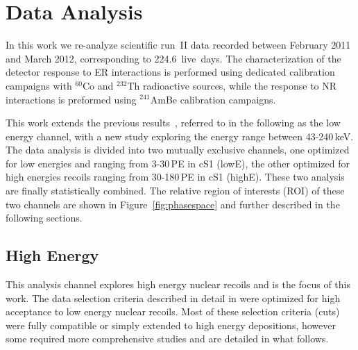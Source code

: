 \section{Data Analysis}
\label{sec:Analysis}
In this work we re-analyze  scientific run~II data recorded between February 2011 and March 2012, 
corresponding to 224.6~live~days. The characterization of the detector response to ER interactions is performed using dedicated calibration campaigns with $^{60}$Co and $^{232}$Th radioactive sources, while the response to NR interactions is preformed using $^{241}$AmBe calibration campaigns.

 
This work extends the previous results~\cite{xe100_run10_si,xe100_run_combination}, referred to in the following as the low energy channel, with a new study exploring the energy range between 43-240\,keV. 
The data analysis is divided into two mutually exclusive channels, one optimized for low energies and ranging from 3-30\,PE in cS1 (lowE), 
the other optimized for high energies recoils ranging from 30-180\,PE in cS1 (highE).  These two analysis are finally statistically combined. 
The relative region of interests (ROI) of these two channels are shown in Figure~\ref{fig:phasespace} and further described in the following sections. 



\subsection{High Energy}
\label{subsubsec:HighE}
This analysis channel explores high energy nuclear recoils and is the focus of this work. The data selection criteria described in detail in \cite{Aprile:2012vw} were optimized for high 
acceptance to low energy nuclear recoils.
Most of these selection criteria (cuts) were fully compatible or simply extended to high energy depositions, however some required
more comprehensive studies and are detailed in what follows. 

